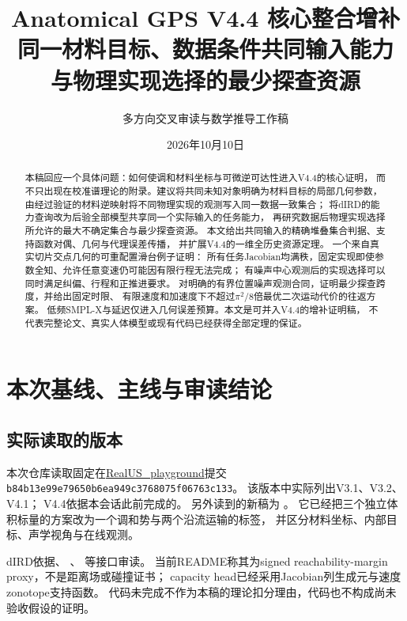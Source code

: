 \documentclass[11pt,a4paper]{article}
\numberwithin{equation}{section}
\theoremstyle{definition}
\begin{document}
\title{Anatomical GPS V4.4 核心整合增补\\[2mm]
\large 同一材料目标、数据条件共同输入能力\\与物理实现选择的最少探查资源}
\author{多方向交叉审读与数学推导工作稿}
\date{2026年10月10日}
\maketitle
\begin{abstract}
本稿回应一个具体问题：如何使调和材料坐标与可微逆可达性进入V4.4的核心证明，
而不只出现在校准谱理论的附录。建议将共同未知对象明确为材料目标的局部几何参数，
由经过验证的材料逆映射将不同物理实现的观测写入同一数据一致集合；
将dIRD的能力查询改为后验全部模型共享同一个实际输入的任务能力，
再研究数据后物理实现选择所允许的最大不确定集合与最少探查资源。
本文给出共同输入的精确堆叠集合判据、支持函数对偶、几何与代理误差传播，
并扩展V4.4的一维全历史资源定理。
一个来自真实切片交点几何的可重配置滑台例子证明：
所有任务Jacobian均满秩，固定实现即使参数全知、允许任意变速仍可能因有限行程无法完成；
有噪声中心观测后的实现选择可以同时满足纠偏、行程和正推进要求。
对明确的有界位置噪声观测合同，证明最少探查跨度，并给出固定时限、
有限速度和加速度下不超过$\pi^2/8$倍最优二次运动代价的往返方案。
低频SMPL-X与延迟仅进入几何误差预算。本文是可并入V4.4的增补证明稿，
不代表完整论文、真实人体模型或现有代码已经获得全部定理的保证。
\end{abstract}
\tableofcontents
\newpage

\section{本次基线、主线与审读结论}
\subsection{实际读取的版本}
本次仓库读取固定在\href{https://github.com/NingMeng0903/RealUS_playground/tree/b84b13e99e79650b6ea949c3768075f06763c133}{RealUS\_playground}提交\\
\texttt{b84b13e99e79650b6ea949c3768075f06763c133}。
该版本中实际列出V3.1、V3.2、V4.1；
V4.4依据本会话此前完成的。
另外读到的新稿为
。
它已经把三个独立体积标量的方案改为一个调和势与两个沿流运输的标签，
并区分材料坐标、内部目标、声学视角与在线观测。

dIRD依据、
、
等接口审读。
当前README称其为signed reachability-margin proxy，不是距离场或碰撞证书；
capacity head已经采用Jacobian列生成元与速度zonotope支持函数。
代码未完成不作为本稿的理论扣分理由，代码也不构成尚未验收假设的证明。
\end{document}

